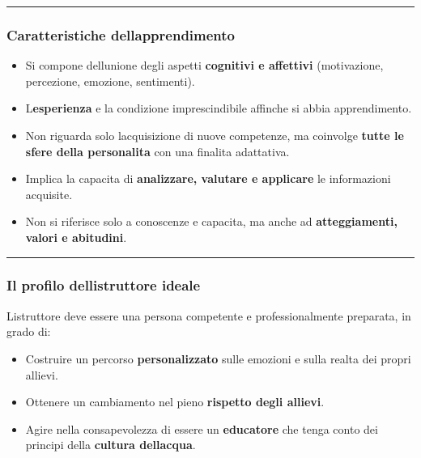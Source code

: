 \documentclass[a4paper,11pt]{article}
\providecommand{\tightlist}{%
  \setlength{\itemsep}{0pt}\setlength{\parskip}{0pt}}
\begin{document}
\begin{center}\rule{0.5\linewidth}{0.5pt}\end{center}

\subsubsection{Caratteristiche
      dell\textquotesingle apprendimento}\label{caratteristiche-dellapprendimento}

\begin{itemize}
      \tightlist
      \item
            Si compone dell\textquotesingle unione degli aspetti \textbf{cognitivi
                  e affettivi} (motivazione, percezione, emozione, sentimenti).
      \item
            L\textquotesingle{}\textbf{esperienza} e la condizione imprescindibile
            affinche si abbia apprendimento.
      \item
            Non riguarda solo l\textquotesingle acquisizione di nuove competenze,
            ma coinvolge \textbf{tutte le sfere della personalita} con una
            finalita adattativa.
      \item
            Implica la capacita di \textbf{analizzare, valutare e applicare} le
            informazioni acquisite.
      \item
            Non si riferisce solo a conoscenze e capacita, ma anche ad
            \textbf{atteggiamenti, valori e abitudini}.
\end{itemize}

\begin{center}\rule{0.5\linewidth}{0.5pt}\end{center}

\subsubsection{Il profilo dell\textquotesingle istruttore
      ideale}\label{il-profilo-dellistruttore-ideale}

L\textquotesingle istruttore deve essere una persona competente e
professionalmente preparata, in grado di:

\begin{itemize}
      \tightlist
      \item
            Costruire un percorso \textbf{personalizzato} sulle emozioni e sulla
            realta dei propri allievi.
      \item
            Ottenere un cambiamento nel pieno \textbf{rispetto degli allievi}.
      \item
            Agire nella consapevolezza di essere un \textbf{educatore} che tenga
            conto dei principi della \textbf{cultura dell\textquotesingle acqua}.
\end{itemize}
\end{document}
